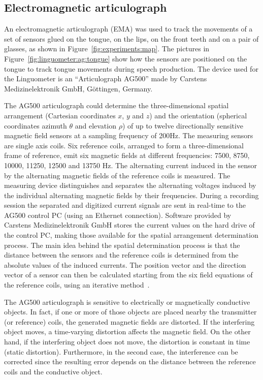 \subsection{Electromagnetic articulograph}
\label{sec:linguometer:instrumentation:ag}
An electromagnetic articulograph (EMA) was used to track the movements of a set
of sensors glued on the tongue, on the lips, on the front teeth and on 
a pair of glasses, as shown in Figure~\ref{fig:experiments:map}.
The pictures in Figure~\ref{fig:linguometer:ag:tongue} show how the sensors are
positioned on the tongue to track tongue movements during speech production.
The device used for the Linguometer is an ``Articulograph AG500'' made by
Carstens Medizinelektronik GmbH, G\"ottingen, Germany.

The AG500 articulograph could determine the three-dimensional spatial 
arrangement (Cartesian coordinates $x$, $y$ and $z$) and the orientation
(spherical coordinates azimuth $\theta$ and elevation $\rho$)
of up to twelve 
directionally sensitive magnetic field sensors at a sampling frequency of 200Hz.
The measuring sensors are single axis coils.
Six reference coils, arranged to form a three-dimensional frame of
reference, emit six magnetic fields at different frequencies:
7500, 8750, 10000, 11250, 12500 and 13750 Hz.
The alternating current induced in the sensor by the alternating magnetic fields
of the reference coils is measured.
The measuring device distinguishes and separates the alternating voltages
induced by the individual alternating magnetic fields by their 
frequencies.
During a recording session the separated and digitized current signals are
sent in real-time to the AG500 control PC (using an Ethernet connection).
Software provided by Carstens Medizinelektronik GmbH stores the current values
on the hard drive of the control PC, making those available for the spatial 
arrangement determination process.
The main idea behind the spatial determination process is that the distance 
between the sensors and the reference coils is determined from the
absolute values of the induced currents. 
The position vector and the direction vector of a sensor can then be calculated
starting from the six field equations of the reference coils, using an iterative
method~\citep{zierdt.carstens:1993}.


The AG500 articulograph is sensitive to electrically or magnetically conductive
objects. 
In fact, if one or more of those objects are placed nearby the transmitter (or
reference) coils, the generated magnetic fields are distorted.
If the interfering object moves, a time-varying distortion affects the
magnetic field.
On the other hand, if the interfering object does not move, the
distortion is constant in time (static distortion). 
Furthermore, in the second case, the interference can be
corrected since the resulting error depends on the distance between the
reference coils and the conductive object.

